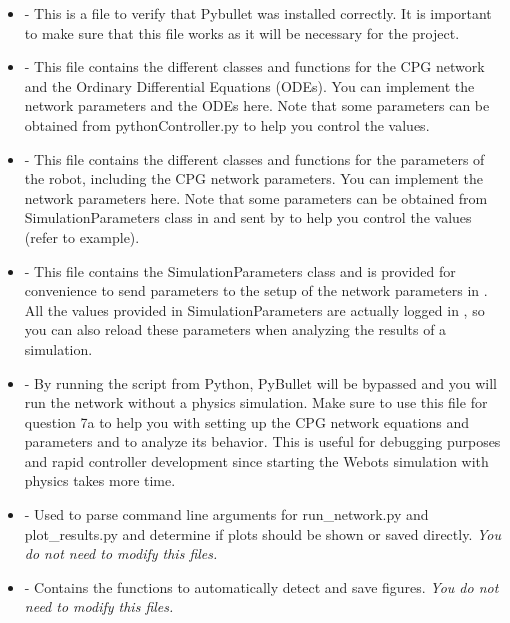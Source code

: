 \documentclass{cmc}
\begin{document}
\begin{itemize}
\item {} - This is a file to verify that Pybullet was
  installed correctly. It is important to make sure that this file works as it
  will be necessary for the project.
\item {} - This
  file contains the different classes and functions for the CPG network and the
  Ordinary Differential Equations (ODEs). You can implement the network
  parameters and the ODEs here. Note that some parameters can be obtained from
  pythonController.py to help you control the values.
\item
   -
  This file contains the different classes and functions for the parameters of
  the robot, including the CPG network parameters. You can implement the network
  parameters here. Note that some parameters can be obtained from
  SimulationParameters class in  and sent by
   to help you control the values (refer to example).
\item
  - This file contains the SimulationParameters class and is provided for
  convenience to send parameters to the setup of the network parameters in
  \-. All the values provided in SimulationParameters
  are actually logged in \-, so you can also reload these
  parameters when analyzing the results of a simulation.
\item {} -
  By running the script from Python, PyBullet will be bypassed and you will run
  the network without a physics simulation. Make sure to use this file for
  question 7a to help you with setting up the CPG network equations and
  parameters and to analyze its behavior. This is useful for debugging purposes
  and rapid controller development since starting the Webots simulation with
  physics takes more time.
\item {} -
  Used to parse command line arguments for run\_network.py and plot\_results.py
  and determine if plots should be shown or saved directly. \textit{You do not
    need to modify this files.}
\item {} -
  Contains the functions to automatically detect and save figures. \textit{You
    do not need to modify this files.}
\end{itemize}
\end{document}
